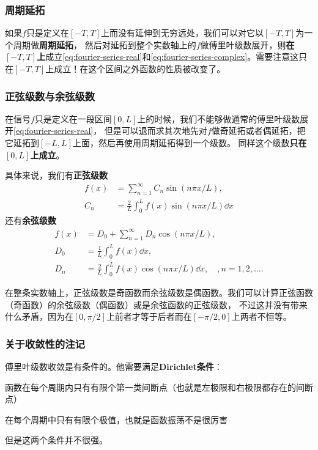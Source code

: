 \documentclass[UTF8]{ctexart}
\renewenvironment{itemize}{\begin{compactitem}}{\end{compactitem}}
\begin{document}
\subsubsection{周期延拓}
如果$f$只是定义在$[-T, T]$上而没有延伸到无穷远处，我们可以对它以$[-T,T]$为一个周期做\textbf{周期延拓}，
然后对延拓到整个实数轴上的$f$做傅里叶级数展开，则\textbf{在$[-T, T]$上}成立\eqref{eq:fourier-series-real}和\eqref{eq:fourier-series-complex}。需要注意这只在$[-T, T]$上成立！在这个区间之外函数的性质被改变了。

\subsubsection{正弦级数与余弦级数}

在信号$f$只是定义在一段区间$[0, L]$上的时候，我们不能够做通常的傅里叶级数展开\eqref{eq:fourier-series-real}，
但是可以退而求其次地先对$f$做奇延拓或者偶延拓，把它延拓到$[-L, L]$上面，然后再使用周期延拓得到一个级数。
同样这个级数\textbf{只在$[0, L]$上成立}。

具体来说，我们有\textbf{正弦级数}
\begin{equation}
    \begin{aligned}
        f(x) &= \sum_{n=1}^\infty C_n \sin \left(n\pi x / L\right), \\
        C_n &= \frac{2}{L} \int_0^L f(x) \sin \left(n\pi x / L\right) \dd x
    \end{aligned}
\end{equation}
还有\textbf{余弦级数}
\begin{equation}
    \begin{aligned}
        f(x) &= D_0 + \sum_{n=1}^\infty D_n \cos \left(n\pi x / L\right), \\
        D_0 &= \frac{1}{L} \int_0^L f(x) \dd x, \\
        D_n &= \frac{2}{L} \int_0^L f(x) \cos \left(n\pi x / L\right) \dd x, \quad, n = 1, 2, \ldots.
    \end{aligned}
\end{equation}

在整条实数轴上，正弦级数是奇函数而余弦级数是偶函数。我们可以计算正弦函数（奇函数）的余弦级数（偶函数）或是余弦函数的正弦级数，
不过这并没有带来什么矛盾，因为在$[0, \pi/2]$上前者才等于后者而在$[- \pi/2, 0]$上两者不恒等。

\subsubsection{关于收敛性的注记}
傅里叶级数收敛是有条件的。他需要满足\textbf{Dirichlet条件}：
\begin{itemize}
    \item 函数在每个周期内只有有限个第一类间断点（也就是左极限和右极限都存在的间断点）
    \item 在每个周期中只有有限个极值，也就是函数振荡不是很厉害
\end{itemize}
但是这两个条件并不很强。
\end{document}
